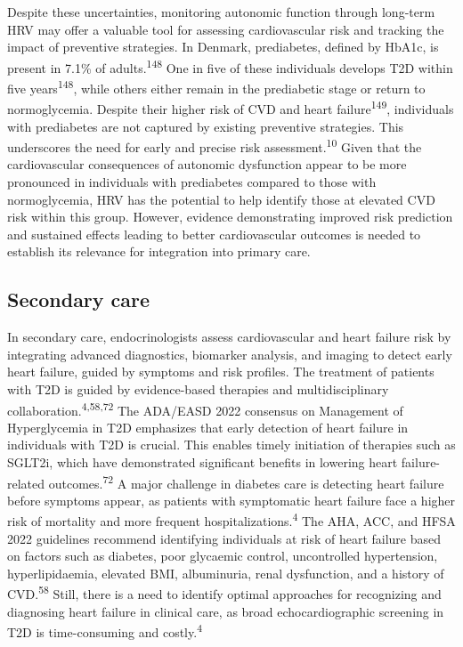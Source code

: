 \documentclass[
  a4paper,
  headsepline=true,
  open=any]{scrbook}
\begin{document}
Despite these uncertainties, monitoring autonomic function through
long-term HRV may offer a valuable tool for assessing cardiovascular
risk and tracking the impact of preventive strategies. In Denmark,
prediabetes, defined by HbA1c, is present in 7.1\% of
adults.\textsuperscript{148} One in five of these individuals develops
T2D within five years\textsuperscript{148}, while others either remain
in the prediabetic stage or return to normoglycemia. Despite their
higher risk of CVD and heart failure\textsuperscript{149}, individuals
with prediabetes are not captured by existing preventive strategies.
This underscores the need for early and precise risk
assessment.\textsuperscript{10} Given that the cardiovascular
consequences of autonomic dysfunction appear to be more pronounced in
individuals with prediabetes compared to those with normoglycemia, HRV
has the potential to help identify those at elevated CVD risk within
this group. However, evidence demonstrating improved risk prediction and
sustained effects leading to better cardiovascular outcomes is needed to
establish its relevance for integration into primary care.

\hypertarget{secondary-care}{%
\subsection{Secondary care}\label{secondary-care}}

In secondary care, endocrinologists assess cardiovascular and heart
failure risk by integrating advanced diagnostics, biomarker analysis,
and imaging to detect early heart failure, guided by symptoms and risk
profiles. The treatment of patients with T2D is guided by evidence-based
therapies and multidisciplinary collaboration.\textsuperscript{4,58,72}
The ADA/EASD 2022 consensus on Management of Hyperglycemia in T2D
emphasizes that early detection of heart failure in individuals with T2D
is crucial. This enables timely initiation of therapies such as SGLT2i,
which have demonstrated significant benefits in lowering heart
failure-related outcomes.\textsuperscript{72} A major challenge in
diabetes care is detecting heart failure before symptoms appear, as
patients with symptomatic heart failure face a higher risk of mortality
and more frequent hospitalizations.\textsuperscript{4} The AHA, ACC, and
HFSA 2022 guidelines recommend identifying individuals at risk of heart
failure based on factors such as diabetes, poor glycaemic control,
uncontrolled hypertension, hyperlipidaemia, elevated BMI, albuminuria,
renal dysfunction, and a history of CVD.\textsuperscript{58} Still,
there is a need to identify optimal approaches for recognizing and
diagnosing heart failure in clinical care, as broad echocardiographic
screening in T2D is time-consuming and costly.\textsuperscript{4}
\end{document}
